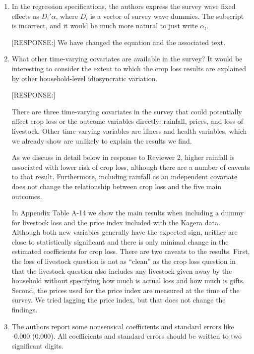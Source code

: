 \documentclass[letterpaper,12pt]{article}
\begin{document}
\begin{enumerate}
\item In the regression specifications, the authors express the survey
wave fixed effects as $D_{i}'\alpha$, where $D_{i}$ is a vector of survey
wave dummies. The subscript is incorrect, and it would be much more
natural to just write $\alpha_{t}$.

[RESPONSE:] We have changed the equation and the associated text.

\item What other time-varying covariates are available in the survey? It
would be interesting to consider the extent to which the crop loss
results are explained by other household-level idiosyncratic variation.

[RESPONSE:] 

There are three time-varying covariates in the survey that could 
potentially affect crop loss or the outcome variables directly:
rainfall, prices, and loss of livestock.
Other time-varying variables are illness and health variables, which 
we already show are unlikely to explain the results we find.

As we discuss in detail below in response to Reviewer 2, higher 
rainfall is associated with lower risk of crop loss, although there
are a number of caveats to that result.
Furthermore, including rainfall as an independent covariate does 
not change the relationship between crop loss and the five main outcomes.

In Appendix Table A-14 we show the main results when including a dummy for livestock
loss and the price index included with the Kagera data.
Although both new variables generally have the expected sign, neither are 
close to statistically significant and there is only minimal change in the 
estimated coefficients for crop loss.
There are two caveats to the results.
First, the loss of livestock question is not as ``clean'' as the
crop loss question in that the livestock question also includes 
any livestock given away by the household without specifying how much 
is actual loss and how much is gifts.
Second, the prices used for the price index are measured at the time
of the survey.
We tried lagging the price index, but that does not change the findings.



\item The authors report some nonsensical coefficients and standard
errors like -0.000 (0.000). All coefficients and standard errors should
be written to two significant digits.


\end{enumerate}
\end{document}
